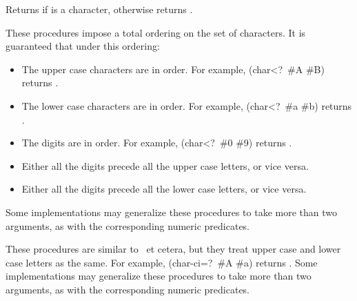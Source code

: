 \begin{entry}{%
}

Returns \schtrue{} if  is a character, otherwise returns \schfalse.

\end{entry}


\begin{entry}{%
}

\label{characterequality}
These procedures impose a total ordering on the set of characters.  It
is guaranteed that under this ordering:

\begin{itemize}
\item The upper case characters are in order.  For example, {\cf 
   (char<?\ \#\backwhack{}A \#\backwhack{}B)} returns \schtrue.
\item The lower case characters are in order.  For example, {\cf 
   (char<?\ \#\backwhack{}a \#\backwhack{}b)} returns \schtrue.
\item The digits are in order.  For example, {\cf 
   (char<?\ \#\backwhack{}0 \#\backwhack{}9)} returns \schtrue.
\item Either all the digits precede all the upper case letters, or vice versa.
\item Either all the digits precede all the lower case letters, or vice versa.
\end{itemize}

Some implementations may generalize these procedures to take more than
two arguments, as with the corresponding numeric predicates.

\end{entry}


\begin{entry}{%
}

These procedures are similar to \ et cetera, but they treat
upper case and lower case letters as the same.  For example, {\cf
(char-ci=?\ \#\backwhack{}A \#\backwhack{}a)} returns \schtrue.  Some
implementations may generalize these procedures to take more than two
arguments, as with the corresponding numeric predicates.

\end{entry}


